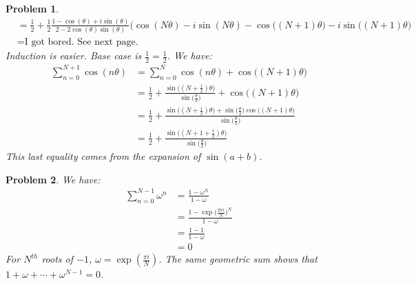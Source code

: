 \documentclass{article}
\theoremstyle{plain}
\theoremstyle{normal}
\newtheorem{problem}{Problem}[section]
\begin{document}
\begin{problem}
\begin{align}
                &=\frac{1}{2}+
                    \frac{1}{2}\frac{1-\cos(\theta)+i\sin(\theta)}
                         {2-2\cos(\theta)\sin(\theta)}
                    \Big(\cos(N\theta)-i\sin(N\theta)-
                          \cos\big((N+1)\theta)-i\sin\big((N+1)\theta\Big)\\
                &=\textrm{I got bored. See next page.}
            \end{align}
            Induction is easier. Base case is $\tfrac{1}{2}=\tfrac{1}{2}$.
            We have:
            \begin{align}
                \sum_{n=0}^{N+1}\cos(n\theta)
                &=\sum_{n=0}^{N}\cos(n\theta)+\cos\big((N+1)\theta\big)\\
                &=\frac{1}{2}+
                    \frac{\sin\big((N+\frac{1}{2})\theta\big)}
                         {\sin\big(\frac{\theta}{2}\big)}
                +\cos\big((N+1)\theta)\\
                &=\frac{1}{2}+\frac{\sin\big((N+\frac{1}{2})\theta)+
                    \sin\big(\frac{\theta}{2}\big)\cos\big((N+1)\theta\big)}
                    {\sin\big(\frac{\theta}{2}\big)}\\
                &=\frac{1}{2}+\frac{\sin\big((N+1+\frac{1}{2})\theta\big)}
                    {\sin\big(\frac{\theta}{2}\big)}
            \end{align}
            This last equality comes from the expansion of $\sin(a+b)$.
        \end{problem}
        \begin{problem}
            We have:
            \begin{align}
                \sum_{n=0}^{N-1}\omega^{n}
                    &=\frac{1-\omega^{N}}{1-\omega}\\
                    &=\frac{1-\exp\big(\frac{2\pi{i}}{N}\big)^{N}}{1-\omega}\\
                    &=\frac{1-1}{1-\omega}\\
                    &=0
            \end{align}
            For $N^{th}$ roots of $-1$, $\omega=\exp(\tfrac{\pi{i}}{N})$.
            The same geometric sum shows that $1+\omega+\cdots+\omega^{N-1}=0$.
        \end{problem}
\end{document}
